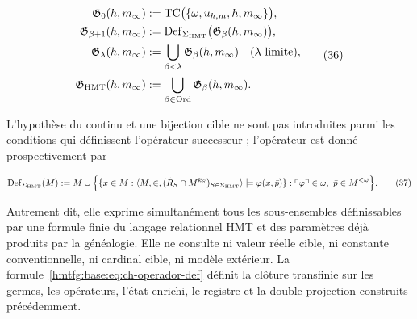 \[
 \begin{aligned}
  \mathfrak G_0(h,m_\infty)
  &:=\operatorname{TC}\bigl(\{\omega,u_{h,m},h,m_\infty\}\bigr),\\
  \mathfrak G_{\beta+1}(h,m_\infty)
  &:=\operatorname{Def}_{\Sigma_{\rm HMT}}
       \bigl(\mathfrak G_\beta(h,m_\infty)\bigr),\\
  \mathfrak G_\lambda(h,m_\infty)
  &:=\bigcup_{\beta<\lambda}\mathfrak G_\beta(h,m_\infty)
       \quad(\lambda\text{ limite}),\\
  \mathfrak G_{\rm HMT}(h,m_\infty)
  &:=\bigcup_{\beta\in\operatorname{Ord}}
       \mathfrak G_\beta(h,m_\infty).
 \end{aligned}
\tag{36}\label{hmtfg:base:eq:ch-clausura-transfinita}
\]

L'hypothèse du continu et une bijection cible ne sont pas introduites parmi les conditions qui définissent l'opérateur successeur ; l'opérateur est donné prospectivement par

\[
 \operatorname{Def}_{\Sigma_{\rm HMT}}(M)
 :=M\cup
 \Bigl\{
   \{x\in M:\langle M,\in,
       (\dot R_S\cap M^{k_S})_{S\in\Sigma_{\rm HMT}}\rangle
       \models\varphi(x,\bar p)\}:
   \ulcorner\varphi\urcorner\in\omega,
   \ \bar p\in M^{<\omega}
 \Bigr\}.
\tag{37}\label{hmtfg:base:eq:ch-operador-def}
\]

Autrement dit, elle exprime simultanément tous les sous-ensembles définissables par une formule finie du langage relationnel HMT et des paramètres déjà produits par la généalogie. Elle ne consulte ni valeur réelle cible, ni constante conventionnelle, ni cardinal cible, ni modèle extérieur. La formule~\eqref{hmtfg:base:eq:ch-operador-def} définit la clôture transfinie sur les germes, les opérateurs, l'état enrichi, le registre et la double projection construits précédemment.

